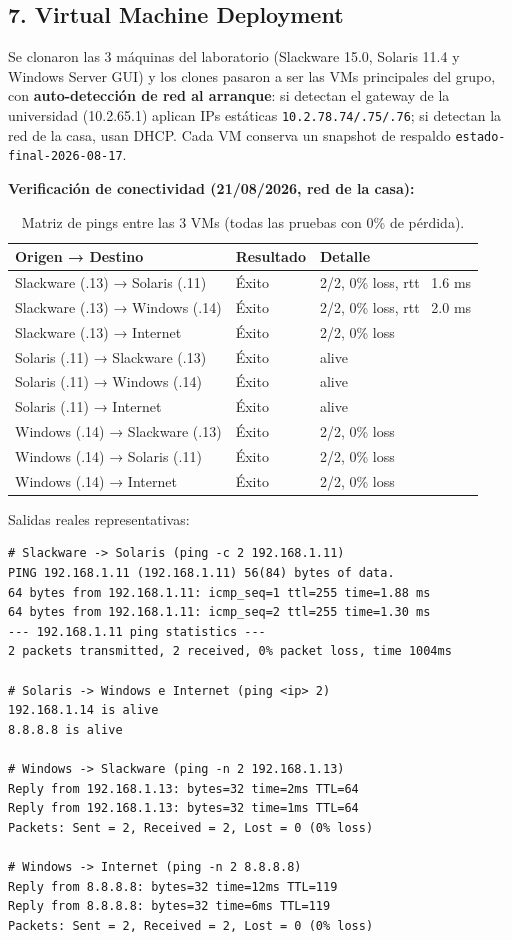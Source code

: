 \subsection{7. Virtual Machine Deployment}

Se clonaron las 3 máquinas del laboratorio (Slackware 15.0, Solaris 11.4 y Windows Server GUI) y los clones pasaron a ser las VMs principales del grupo, con \textbf{auto-detección de red al arranque}: si detectan el gateway de la universidad (10.2.65.1) aplican IPs estáticas \texttt{10.2.78.74/.75/.76}; si detectan la red de la casa, usan DHCP. Cada VM conserva un snapshot de respaldo \texttt{estado-final-2026-08-17}.

\textbf{Verificación de conectividad (21/08/2026, red de la casa):}

\begin{table}[H]
  \centering
  \begin{tabular}{lll}
    \toprule
    Origen → Destino & Resultado & Detalle \\
    \midrule
    Slackware (.13) → Solaris (.11) & Éxito & 2/2, 0\% loss, rtt ~1.6 ms \\
    Slackware (.13) → Windows (.14) & Éxito & 2/2, 0\% loss, rtt ~2.0 ms \\
    Slackware (.13) → Internet & Éxito & 2/2, 0\% loss \\
    Solaris (.11) → Slackware (.13) & Éxito & alive \\
    Solaris (.11) → Windows (.14) & Éxito & alive \\
    Solaris (.11) → Internet & Éxito & alive \\
    Windows (.14) → Slackware (.13) & Éxito & 2/2, 0\% loss \\
    Windows (.14) → Solaris (.11) & Éxito & 2/2, 0\% loss \\
    Windows (.14) → Internet & Éxito & 2/2, 0\% loss \\
    \bottomrule
  \end{tabular}
  \caption{Matriz de pings entre las 3 VMs (todas las pruebas con 0\% de pérdida).}
\end{table}

Salidas reales representativas:

\begin{lstlisting}
# Slackware -> Solaris (ping -c 2 192.168.1.11)
PING 192.168.1.11 (192.168.1.11) 56(84) bytes of data.
64 bytes from 192.168.1.11: icmp_seq=1 ttl=255 time=1.88 ms
64 bytes from 192.168.1.11: icmp_seq=2 ttl=255 time=1.30 ms
--- 192.168.1.11 ping statistics ---
2 packets transmitted, 2 received, 0% packet loss, time 1004ms

# Solaris -> Windows e Internet (ping <ip> 2)
192.168.1.14 is alive
8.8.8.8 is alive

# Windows -> Slackware (ping -n 2 192.168.1.13)
Reply from 192.168.1.13: bytes=32 time=2ms TTL=64
Reply from 192.168.1.13: bytes=32 time=1ms TTL=64
Packets: Sent = 2, Received = 2, Lost = 0 (0% loss)

# Windows -> Internet (ping -n 2 8.8.8.8)
Reply from 8.8.8.8: bytes=32 time=12ms TTL=119
Reply from 8.8.8.8: bytes=32 time=6ms TTL=119
Packets: Sent = 2, Received = 2, Lost = 0 (0% loss)
\end{lstlisting}


